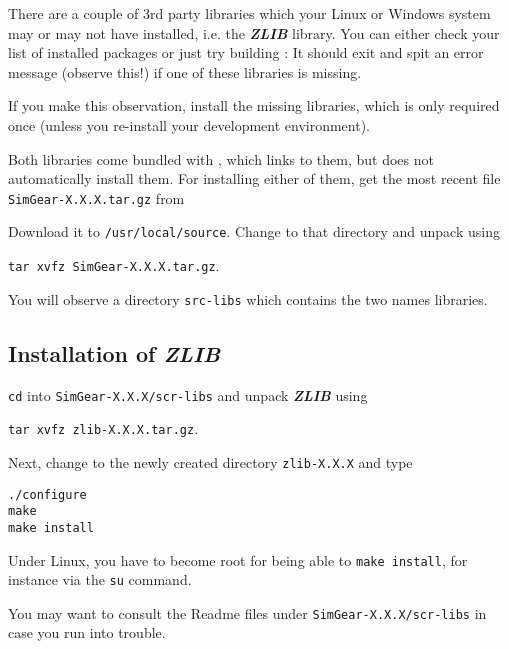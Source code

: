 There are a couple of 3rd party libraries which your Linux or Windows
system may or may not have installed, i.e. the \textbf{\textit{ZLIB}}
library. You can either check your list of installed packages or just
try building \SimGear{}: It should exit and spit an error message
(observe this!) if one of these libraries is missing.

If you make this observation, install the missing libraries, which is
only required once (unless you re-install your development
environment).

Both libraries come bundled with \SimGear{}, which links to them, but
does not automatically install them. For installing either of them, get
the most recent file \texttt{SimGear-X.X.X.tar.gz} from
  \medskip

   \medskip

 \noindent
Download it to \texttt{/usr/local/source}. Change to that directory and unpack \SimGear{}
using

        \texttt{tar xvfz SimGear-X.X.X.tar.gz}.

You will observe a directory \texttt{src-libs} which contains the two names libraries. 

\subsection{Installation of \textbf{\textit{ZLIB}\label{zlibinstall}}}

\noindent
 \texttt{cd} into \texttt{SimGear-X.X.X/scr-libs} and unpack \textbf{\textit{ZLIB}} using
 \medskip
 
 \noindent
 				\texttt{tar xvfz zlib-X.X.X.tar.gz}.
 	\medskip

\noindent 				
 Next, change to the newly created directory \texttt{zlib-X.X.X} and type
 \medskip

 \noindent
        \texttt{./configure}\\
        \texttt{make}\\
        \texttt{make install}
 \medskip

 \noindent
 Under Linux, you have to become root for being able to \texttt{make install}, for instance via the \texttt{su} command. 
 
  You may want to consult the Readme files under \texttt{SimGear-X.X.X/scr-libs} in case you run into trouble.

